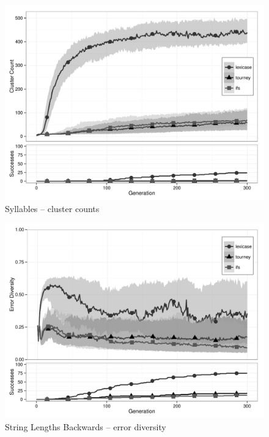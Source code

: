 \begin{figure}[p] %
\centering
\includegraphics[width=11.5cm]{syllables-cluster.pdf}
\caption{Syllables -- cluster counts}
\label{syllablesClu}
\end{figure}

\begin{figure}[p] %
\centering
\includegraphics[width=11.5cm]{string-lengths-backwards-diversity.pdf}
\caption{String Lengths Backwards -- error diversity}
\label{string-lengths-backwardsDiv}
\end{figure}

